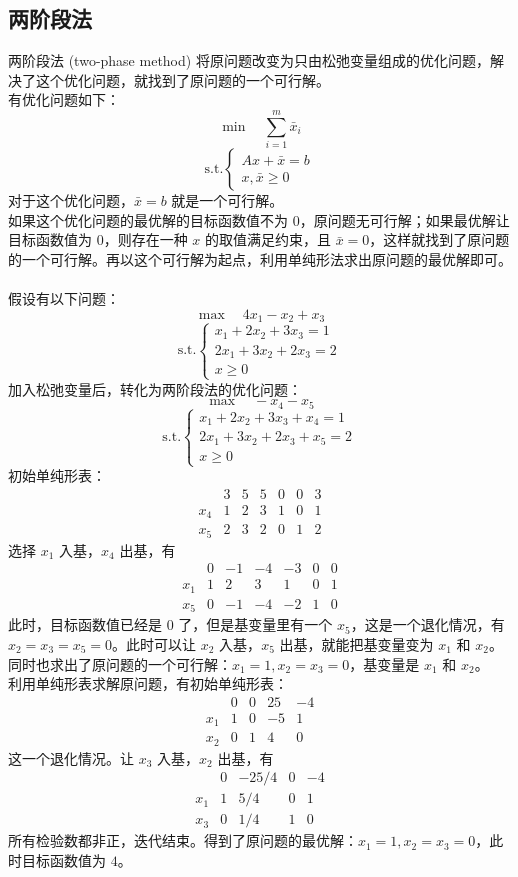\subsection{两阶段法}
两阶段法 (two-phase method) 将原问题改变为只由松弛变量组成的优化问题，解决了这个优化问题，就找到了原问题的一个可行解。 \\
有优化问题如下：
$$
\min \quad \sum_{i = 1}^{m} \bar{x}_i
$$
$$
\text{s.t.} 
\begin{cases}
    Ax + \bar{x} = b \\
    x, \bar{x} \ge 0
\end{cases}
$$
对于这个优化问题，$\bar{x} = b$ 就是一个可行解。 \\
如果这个优化问题的最优解的目标函数值不为 $0$，原问题无可行解；如果最优解让目标函数值为 $0$，则存在一种 $x$ 的取值满足约束，且 $\bar{x} = 0$，这样就找到了原问题的一个可行解。再以这个可行解为起点，利用单纯形法求出原问题的最优解即可。 \\~\\
假设有以下问题：
$$
\max \quad 4x_1 - x_2 + x_3
$$
$$
\text{s.t.} 
\begin{cases}
    x_1 + 2x_2 + 3x_3 = 1 \\
    2x_1 + 3x_2 + 2x_3 = 2 \\
    x \ge 0
\end{cases}
$$
加入松弛变量后，转化为两阶段法的优化问题：
$$
\max \quad -x_4 - x_5
$$
$$
\text{s.t.} 
\begin{cases}
    x_1 + 2x_2 + 3x_3 + x_4 = 1 \\
    2x_1 + 3x_2 + 2x_3 + x_5 = 2 \\
    x \ge 0
\end{cases}
$$
初始单纯形表：
$$
\begin{array}{c|ccccc|c} & 3 & 5 & 5 & 0 & 0 & 3 \\ \hline x_4 & 1 & 2 & 3 & 1 & 0 & 1 \\ x_5 & 2 & 3 & 2 & 0 & 1 & 2\end{array}
$$
选择 $x_1$ 入基，$x_4$ 出基，有
$$
\begin{array}{c|ccccc|c} & 0 & -1 & -4 & -3 & 0 & 0 \\ \hline x_1 & 1 & 2 & 3 & 1 & 0 & 1 \\ x_5 & 0 & -1 & -4 & -2 & 1 & 0 \end{array}
$$
此时，目标函数值已经是 $0$ 了，但是基变量里有一个 $x_5$，这是一个退化情况，有 $x_2 = x_3 = x_5 = 0$。此时可以让 $x_2$ 入基，$x_5$ 出基，就能把基变量变为 $x_1$ 和 $x_2$。同时也求出了原问题的一个可行解：$x_1 = 1, x_2 = x_3 = 0$，基变量是 $x_1$ 和 $x_2$。 \\
利用单纯形表求解原问题，有初始单纯形表：
$$
\begin{array}{c|ccc|c} & 0 & 0 & 25 & -4 \\ \hline x_1 & 1 & 0 & -5 & 1 \\ x_2 & 0 & 1 & 4 & 0 \end{array}
$$
这一个退化情况。让 $x_3$ 入基，$x_2$ 出基，有
$$
\begin{array}{c|ccc|c} & 0 & -25/4 & 0 & -4 \\ \hline x_1 & 1 & 5/4 & 0 & 1 \\ x_3 & 0 & 1/4 & 1 & 0 \end{array}
$$
所有检验数都非正，迭代结束。得到了原问题的最优解：$x_1 = 1, x_2 = x_3 = 0$，此时目标函数值为 $4$。
\pagebreak
